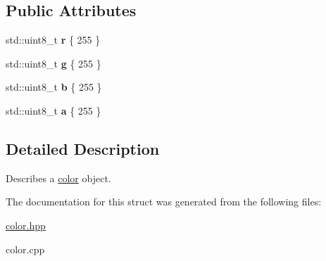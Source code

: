 \subsection*{Public Attributes}
\begin{DoxyCompactItemize}
\item 
\mbox{\label{structhw_1_1color_a0c82fd81a3adb5918bc06efd1c50bde9}} 
std\+::uint8\+\_\+t {\bfseries r} \{ 255 \}
\item 
\mbox{\label{structhw_1_1color_a2f80976f6bb10406451e37fb0ad895b9}} 
std\+::uint8\+\_\+t {\bfseries g} \{ 255 \}
\item 
\mbox{\label{structhw_1_1color_a01e1a347d05d1cf1073d7a3682b4a73a}} 
std\+::uint8\+\_\+t {\bfseries b} \{ 255 \}
\item 
\mbox{\label{structhw_1_1color_ac762e0bb1aaa5b1f34c012c4f9fcc6d3}} 
std\+::uint8\+\_\+t {\bfseries a} \{ 255 \}
\end{DoxyCompactItemize}


\subsection{Detailed Description}
Describes a \mbox{\hyperlink{structhw_1_1color}{color}} object. 

The documentation for this struct was generated from the following files\+:\begin{DoxyCompactItemize}
\item 
\mbox{\hyperlink{color_8hpp}{color.\+hpp}}\item 
color.\+cpp\end{DoxyCompactItemize}
